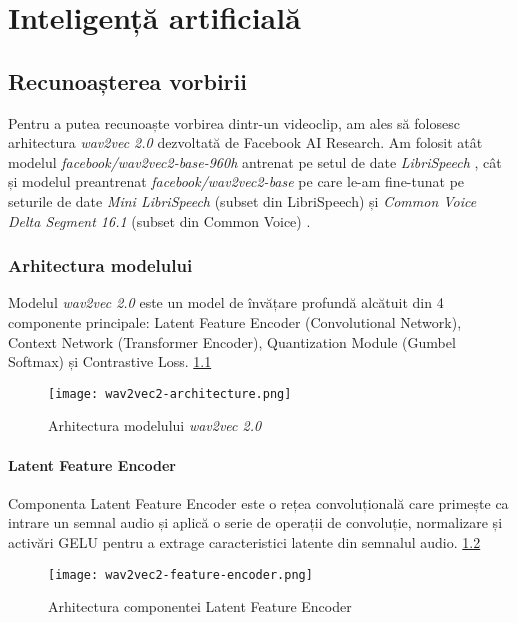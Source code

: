 \chapter{Inteligență artificială}

\section{Recunoașterea vorbirii}
Pentru a putea recunoaște vorbirea dintr-un videoclip, am ales să folosesc arhitectura
\textit{wav2vec 2.0} \cite{wav2vec2} dezvoltată de Facebook AI Research. Am folosit 
atât modelul \textit{facebook/wav2vec2-base-960h} antrenat pe setul de date 
\textit{LibriSpeech} \cite{librispeech}, cât și modelul preantrenat
\textit{facebook/wav2vec2-base} pe care le-am fine-tunat pe seturile
de date \textit{Mini LibriSpeech} (subset din LibriSpeech) și
\textit{Common Voice Delta Segment 16.1} (subset din Common Voice) \cite{commonvoice}.
\par

\subsection{Arhitectura modelului}
Modelul \textit{wav2vec 2.0} este un model de învățare profundă alcătuit din 4
componente principale: Latent Feature Encoder (Convolutional Network), Context 
Network (Transformer Encoder), Quantization Module (Gumbel Softmax) și 
Contrastive Loss. \ref{fig:wav2vec2-architecture}

\begin{figure}[h]
    \centering
    \texttt{[image: wav2vec2-architecture.png]}
    \caption{Arhitectura modelului \textit{wav2vec 2.0} \protect\footnotemark[1]}
    \label{fig:wav2vec2-architecture}
\end{figure}

\subsubsection{Latent Feature Encoder}
\vspace{2em}
Componenta Latent Feature Encoder este o rețea convoluțională care primește ca 
intrare un semnal audio și aplică o serie de operații de convoluție, normalizare
și activări GELU pentru a extrage caracteristici latente din semnalul audio.
\ref{fig:latent-feature-encoder}

\vspace{3em}

\begin{figure}[h]
    \centering
    \texttt{[image: wav2vec2-feature-encoder.png]}
    \caption{Arhitectura componentei Latent Feature Encoder \protect\footnotemark[1]}
    \label{fig:latent-feature-encoder}
\end{figure}


